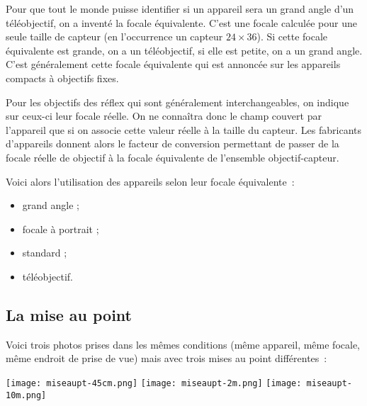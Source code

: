 \documentclass[../main/main.tex]{subfiles}
\begin{document}
Pour que tout le monde puisse identifier si un appareil sera un grand angle d'un
téléobjectif, on a inventé la focale équivalente. C'est une focale calculée pour
une seule taille de capteur (en l'occurrence un capteur $24 \times 36$). Si
cette focale équivalente est grande, on a un téléobjectif, si elle est petite,
on a un grand angle. C'est généralement cette focale équivalente qui est
annoncée sur les appareils compacts à objectifs fixes.

\medskip

Pour les objectifs des réflex qui sont généralement interchangeables, on indique
sur ceux-ci leur focale réelle. On ne connaîtra donc le champ couvert par
l'appareil que si on associe cette valeur réelle à la taille du capteur. Les
fabricants d'appareils donnent alors le facteur de conversion permettant de
passer de la focale réelle de objectif à la focale équivalente de l'ensemble
objectif-capteur.\newline

\medskip

Voici alors l'utilisation des appareils selon leur focale équivalente~: 

\begin{minipage}{0.49\linewidth}
    \begin{itemize}[leftmargin=150pt]
        \item [\textbf{\SIrange{00}{60}{mm}}] grand angle ; 
        \item [\textbf{\SIrange{60}{120}{mm}}] focale à portrait ; 
    \end{itemize}
\end{minipage}
\begin{minipage}{0.49\linewidth}
    \begin{itemize}[leftmargin=70pt]
        \item [\textbf{\SIrange{40}{60}{mm}}] standard ; 
        \item [\textbf{\SIrange{60}{300}{mm}}] téléobjectif.
    \end{itemize}
\end{minipage}

\subsection{La mise au point}

Voici trois photos prises dans les mêmes conditions (même appareil, même focale,
même endroit de prise de vue) mais avec trois mises au point différentes~:
\begin{center}
    \texttt{[image: miseaupt-45cm.png]}
    \texttt{[image: miseaupt-2m.png]}
    \texttt{[image: miseaupt-10m.png]}
\end{center}
\end{document}
